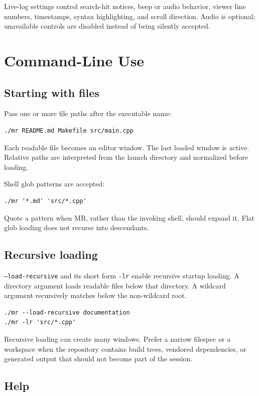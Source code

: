 \documentclass[a4paper,10pt,twoside,openany]{book}
\newcommand{\mr}{\textsc{MR}}
\begin{document}
Live-log settings control search-hit notices, beep or audio behavior, viewer
line numbers, timestamps, syntax highlighting, and scroll direction. Audio is
optional; unavailable controls are disabled instead of being silently
accepted.

\chapter{Command-Line Use}

\section{Starting with files}

Pass one or more file paths after the executable name:
\begin{verbatim}
./mr README.md Makefile src/main.cpp
\end{verbatim}
Each readable file becomes an editor window. The last loaded window is active.
Relative paths are interpreted from the launch directory and normalized before
loading.

Shell glob patterns are accepted:
\begin{verbatim}
./mr '*.md' 'src/*.cpp'
\end{verbatim}
Quote a pattern when \mr{}, rather than the invoking shell, should expand it.
Flat glob loading does not recurse into descendants.

\section{Recursive loading}

\texttt{--load-recursive} and its short form \texttt{-lr} enable recursive
startup loading. A directory argument loads readable files below that
directory. A wildcard argument recursively matches below the non-wildcard
root.
\begin{verbatim}
./mr --load-recursive documentation
./mr -lr 'src/*.cpp'
\end{verbatim}

Recursive loading can create many windows. Prefer a narrow filespec or a
workspace when the repository contains build trees, vendored dependencies, or
generated output that should not become part of the session.

\section{Help}
\end{document}
